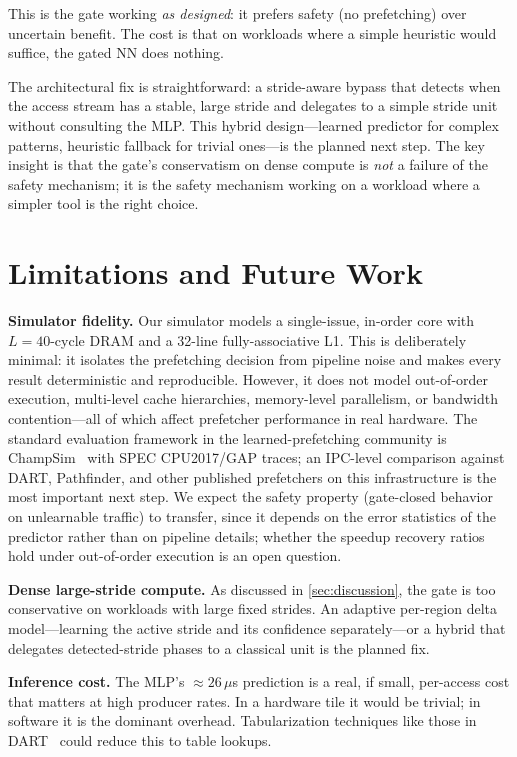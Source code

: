\documentclass[conference]{IEEEtran}
\begin{document}
This is the gate working \emph{as designed}: it prefers safety (no prefetching) over
uncertain benefit. The cost is that on workloads where a simple heuristic would
suffice, the gated NN does nothing.

The architectural fix is straightforward: a stride-aware bypass that detects when the
access stream has a stable, large stride and delegates to a simple stride unit without
consulting the MLP. This hybrid design---learned predictor for complex patterns,
heuristic fallback for trivial ones---is the planned next step. The key insight is
that the gate's conservatism on dense compute is \emph{not} a failure of the safety
mechanism; it is the safety mechanism working on a workload where a simpler tool is
the right choice.

\section{Limitations and Future Work}
\label{sec:limitations}

\textbf{Simulator fidelity.} Our simulator models a single-issue, in-order core with
$L = 40$-cycle DRAM and a 32-line fully-associative L1. This is deliberately minimal:
it isolates the prefetching decision from pipeline noise and makes every result
deterministic and reproducible. However, it does not model out-of-order execution,
multi-level cache hierarchies, memory-level parallelism, or bandwidth contention---all
of which affect prefetcher performance in real hardware. The standard evaluation
framework in the learned-prefetching community is
ChampSim~\cite{champsim} with SPEC CPU2017/GAP traces; an IPC-level comparison
against DART, Pathfinder, and other published prefetchers on this infrastructure is
the most important next step. We expect the safety property (gate-closed behavior on
unlearnable traffic) to transfer, since it depends on the error statistics of the
predictor rather than on pipeline details; whether the speedup recovery ratios hold
under out-of-order execution is an open question.

\textbf{Dense large-stride compute.} As discussed in \cref{sec:discussion}, the gate
is too conservative on workloads with large fixed strides. An adaptive per-region
delta model---learning the active stride and its confidence separately---or a
hybrid that delegates detected-stride phases to a classical unit is the planned fix.

\textbf{Inference cost.} The MLP's ${\approx}26\,\mu$s prediction is a real, if small,
per-access cost that matters at high producer rates. In a hardware tile it would be
trivial; in software it is the dominant overhead. Tabularization techniques like those
in DART~\cite{dart} could reduce this to table lookups.
\end{document}
